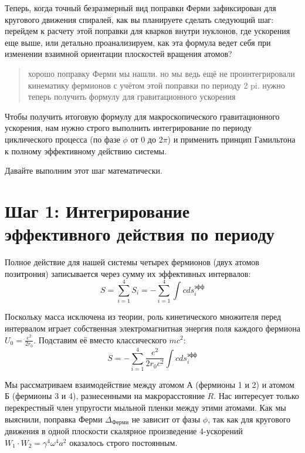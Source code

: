 \documentclass[12pt,a4paper]{article}
\begin{document}
Теперь, когда точный безразмерный вид поправки Ферми зафиксирован для кругового движения спиралей, как вы планируете сделать следующий шаг: перейдем к расчету этой поправки для кварков внутри нуклонов, где ускорения еще выше, или детально проанализируем, как эта формула ведет себя при изменении взаимной ориентации плоскостей вращения атомов?

\begin{quote}
хорошо поправку Ферми мы нашли. но мы ведь ещё не проинтегрировали кинематику фермионов с учётом этой поправки по периоду 2 pi. нужно теперь получить формулу для гравитационного ускорения
\end{quote}

Чтобы получить итоговую формулу для макроскопического гравитационного ускорения, нам нужно строго выполнить интегрирование по периоду циклического процесса (по фазе $\phi$ от $0$ до $2\pi$) и применить принцип Гамильтона к полному эффективному действию системы.

Давайте выполним этот шаг математически.

\section*{Шаг 1: Интегрирование эффективного действия по периоду}

Полное действие для нашей системы четырех фермионов (двух атомов позитрония) записывается через сумму их эффективных интервалов:
\begin{equation}
S = \sum_{i=1}^{4} S_i = - \sum_{i=1}^{4} \int c ds_i^{эфф}
\end{equation}

Поскольку масса исключена из теории, роль кинетического множителя перед интервалом играет собственная электромагнитная энергия поля каждого фермиона $U_0 = \frac{e^2}{2r_0}$. Подставим её вместо классического $m c^2$:
\begin{equation}
S = - \sum_{i=1}^{4} \frac{e^2}{2r_0 c^2} \int c ds_i^{эфф}
\end{equation}

Мы рассматриваем взаимодействие между атомом А (фермионы 1 и 2) и атомом Б (фермионы 3 и 4), разнесенными на макрорасстояние $R$. Нас интересует только перекрестный член упругости мыльной пленки между этими атомами. Как мы выяснили, поправка Ферми $\Delta_{Ферми}$ не зависит от фазы $\phi$, так как для кругового движения в одной плоскости скалярное произведение 4-ускорений $W_1 \cdot W_2 = \gamma^4 \omega^4 a^2$ оказалось строго постоянным.
\end{document}
